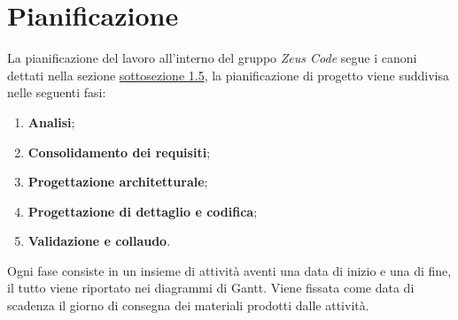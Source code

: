 \section{Pianificazione}
La pianificazione del lavoro all'interno del gruppo \textit{Zeus Code} segue i canoni dettati nella sezione \hyperlink{scadenze}{sottosezione 1.5}, la pianificazione di progetto viene suddivisa nelle seguenti fasi:
\begin{enumerate}
	\item \textbf{Analisi};
	\item \textbf{Consolidamento dei requisiti};
	\item \textbf{Progettazione architetturale};
	\item \textbf{Progettazione di dettaglio e codifica};
	\item \textbf{Validazione e collaudo}.
\end{enumerate}
Ogni fase consiste in un insieme di attività aventi una data di inizio e una di fine, il tutto viene riportato nei diagrammi di Gantt\glo. Viene fissata come data di scadenza il giorno di consegna dei materiali prodotti dalle attività. 
